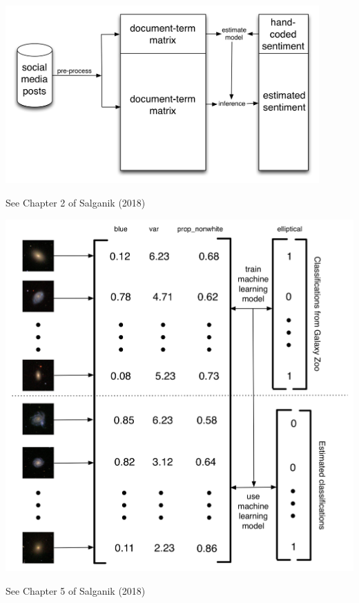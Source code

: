 \documentclass[aspectratio=169]{beamer}
\begin{document}
\begin{frame}

\begin{center}
\includegraphics[width=0.9\textwidth]{figures/king_how_2013_schematic}
\end{center}
\vfill
See Chapter 2 of Salganik (2018)
\end{frame}
\begin{frame}

\begin{center}
\includegraphics[height=0.9\textheight]{figures/gz_banerji_schematic}
\end{center}
\vfill
See Chapter 5 of Salganik (2018)
\end{frame}
\end{document}
